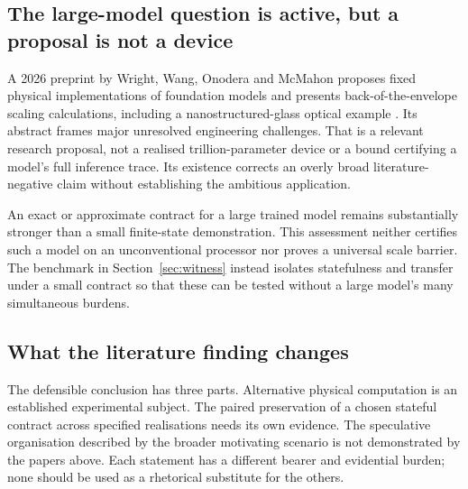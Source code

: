 \subsection{The large-model question is active, but a proposal is not a device}
A 2026 preprint by Wright, Wang, Onodera and McMahon proposes fixed physical implementations of foundation models and presents back-of-the-envelope scaling calculations, including a nanostructured-glass optical example \citep{pfm}. Its abstract frames major unresolved engineering challenges. That is a relevant research proposal, not a realised trillion-parameter device or a bound certifying a model's full inference trace. Its existence corrects an overly broad literature-negative claim without establishing the ambitious application.

An exact or approximate contract for a large trained model remains substantially stronger than a small finite-state demonstration. This assessment neither certifies such a model on an unconventional processor nor proves a universal scale barrier. The benchmark in Section~\ref{sec:witness} instead isolates statefulness and transfer under a small contract so that these can be tested without a large model's many simultaneous burdens.

\subsection{What the literature finding changes}
The defensible conclusion has three parts. Alternative physical computation is an established experimental subject. The paired preservation of a chosen stateful contract across specified realisations needs its own evidence. The speculative organisation described by the broader motivating scenario is not demonstrated by the papers above. Each statement has a different bearer and evidential burden; none should be used as a rhetorical substitute for the others.
